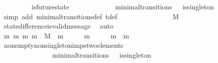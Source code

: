 \begin{isabellebody}
\ {\isachardoublequoteopen}{\isasymsigma}{\isacharprime}\ {\isasymin}\ {\isasymSigma}\ {\isasymand}\ {\isasymsigma}\ {\isasymin}\ {\isasymSigma}\ {\isasymand}\ is{\isacharunderscore}future{\isacharunderscore}state\ {\isacharparenleft}{\isasymsigma}{\isacharcomma}\ {\isasymsigma}{\isacharprime}{\isacharparenright}{\isachardoublequoteclose}\isanewline
\ \ \ \ \ \ \isamarkupfalse%
\ {\isacartoucheopen}{\isacharparenleft}{\isasymsigma}{\isacharcomma}\ {\isasymsigma}{\isacharprime}{\isacharparenright}\ {\isasymin}\ minimal{\isacharunderscore}transitions\ {\isasymand}\ {\isasymnot}\ is{\isacharunderscore}singleton\ {\isacharparenleft}{\isasymsigma}{\isacharprime}\ {\isacharminus}\ {\isasymsigma}{\isacharparenright}{\isacartoucheclose}\isanewline
\ \ \ \ \ \ \isamarkupfalse%
\ {\isacharparenleft}simp\ add{\isacharcolon}\ minimal{\isacharunderscore}transitions{\isacharunderscore}def\ {\isasymSigma}t{\isacharunderscore}def{\isacharparenright}\ \ \ \ \isanewline
\ \ \ \ \isamarkupfalse%
\ \isamarkupfalse%
\ {\isachardoublequoteopen}{\isasymsigma}{\isacharprime}\ {\isacharminus}\ {\isasymsigma}\ {\isasymsubseteq}\ M{\isachardoublequoteclose}\isanewline
\ \ \ \ \ \ \isamarkupfalse%
\ state{\isacharunderscore}difference{\isacharunderscore}is{\isacharunderscore}valid{\isacharunderscore}message\ \isamarkupfalse%
\ auto\ \ \ \ \ \ \isanewline
\ \ \ \ \isamarkupfalse%
\ \isamarkupfalse%
\ {\isachardoublequoteopen}{\isasymexists}m{}\ m{}{\isachardot}\ {\isacharbraceleft}m{}{\isacharcomma}\ m{}{\isacharbraceright}\ {\isasymsubseteq}\ M\ {\isasymand}\ m{}\ {\isasymin}\ {\isasymsigma}{\isacharprime}\ {\isacharminus}\ {\isasymsigma}\ {\isasymand}\ m{}\ {\isasymin}\ {\isasymsigma}{\isacharprime}\ {\isacharminus}\ {\isasymsigma}\ {\isasymand}\ m{}\ {\isasymnoteq}\ m{}{\isachardoublequoteclose}\isanewline
\ \ \ \ \ \ \isamarkupfalse%
\ non{\isacharunderscore}empty{\isacharunderscore}non{\isacharunderscore}singleton{\isacharunderscore}imps{\isacharunderscore}two{\isacharunderscore}elements\ \isanewline
\ \ \ \ \ \ \ \ \ \ \ \ {\isacartoucheopen}{\isacharparenleft}{\isasymsigma}{\isacharcomma}\ {\isasymsigma}{\isacharprime}{\isacharparenright}\ {\isasymin}\ minimal{\isacharunderscore}transitions\ {\isasymand}\ {\isasymnot}\ is{\isacharunderscore}singleton\ {\isacharparenleft}{\isasymsigma}{\isacharprime}\ {\isacharminus}\ {\isasymsigma}{\isacharparenright}{\isacartoucheclose}\ \ {\isacartoucheopen}{\isasymsigma}{\isacharprime}\ {\isacharminus}\ {\isasymsigma}\ {\isasymnoteq}\ {\isasymemptyset}{\isacartoucheclose}\isanewline

\end{isabellebody}
